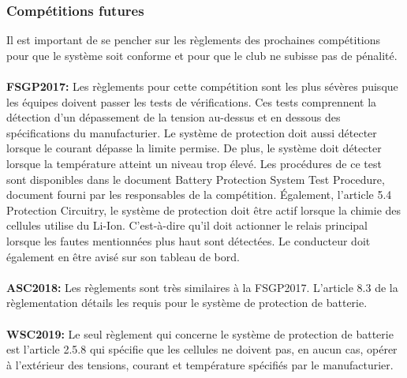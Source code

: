		
	\subsubsection{Compétitions futures}
		Il est important de se pencher sur les règlements des prochaines compétitions pour que le système soit conforme et pour que le club ne subisse pas de pénalité.
		
		\paragraph{}
		\textbf{FSGP2017:} Les règlements pour cette compétition sont les plus sévères puisque les équipes doivent passer les tests de vérifications. Ces tests comprennent la détection d'un dépassement de la tension au-dessus et en dessous des spécifications du manufacturier. Le système de protection doit aussi détecter lorsque le courant dépasse la limite permise. De plus, le système doit détecter lorsque la température atteint un niveau trop élevé. Les procédures de ce test sont disponibles dans le document Battery Protection System Test Procedure, document fourni par les responsables de la compétition. Également, l'article 5.4 Protection Circuitry, le système de protection doit être actif lorsque la chimie des cellules utilise du Li-Ion. C'est-à-dire qu'il doit actionner le relais principal lorsque les fautes mentionnées plus haut sont détectées. Le conducteur doit également en être avisé sur son tableau de bord. \cite{reg_fsgp2017}
		
		\paragraph{}
		\textbf{ASC2018:} Les règlements sont très similaires à la FSGP2017. L'article 8.3 de la règlementation détails les requis pour le système de protection de batterie. \cite{reg_asc2018}
		
		\paragraph{}
		\textbf{WSC2019:} Le seul règlement qui concerne le système de protection de batterie est l'article 2.5.8 qui spécifie que les cellules ne doivent pas, en aucun cas, opérer à l'extérieur des tensions, courant et température spécifiés par le manufacturier. \cite{reg_wsc2017}

